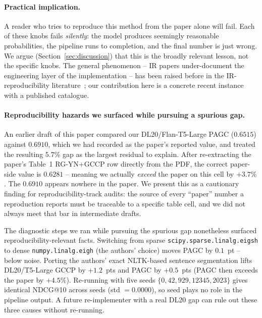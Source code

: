 \documentclass[sigconf]{acmart}
\begin{document}
\paragraph{Practical implication.} A reader who tries to reproduce
this method from the paper alone will fail. Each of these knobs
fails \emph{silently}: the model produces seemingly reasonable
probabilities, the pipeline runs to completion, and the final number
is just wrong. We argue (Section~\ref{sec:discussion}) that this is
the broadly relevant lesson, not the specific knobs. The general
phenomenon -- IR papers under-document the engineering layer of the
implementation -- has been raised before in the IR-reproducibility
literature~\cite{breuer2020repro,lin2022leveraging,lin2018msmarco};
our contribution here is a concrete recent instance with a published
catalogue.

\paragraph{Reproducibility hazards we surfaced while pursuing a
spurious gap.} An earlier draft of this paper compared our
DL20/Flan-T5-Large PAGC ($0.6515$) against $0.6910$, which we had
recorded as the paper's reported value, and treated the resulting
$5.7\%$ gap as the largest residual to explain. After re-extracting
the paper's Table~1 RG-YN+GCCP row directly from the PDF, the
correct paper-side value is $0.6281$ -- meaning we actually
\emph{exceed} the paper on this cell by $+3.7\%$. The $0.6910$
appears nowhere in the paper. We present this as a cautionary
finding for reproducibility-track audits: the source of every
``paper'' number a reproduction reports must be traceable to a
specific table cell, and we did not always meet that bar in
intermediate drafts.

The diagnostic steps we ran while pursuing the spurious gap
nonetheless surfaced reproducibility-relevant facts. Switching
from sparse \texttt{scipy.sparse.linalg.eigsh} to dense
\texttt{numpy.linalg.eigh} (the authors' choice) moves PAGC by
$0.1$~pt -- below noise. Porting the authors' exact NLTK-based
sentence segmentation lifts DL20/T5-Large GCCP by $+1.2$~pts and
PAGC by $+0.5$~pts (PAGC then exceeds the paper by $+4.5\%$).
Re-running with five seeds $\{0, 42, 929, 12345, 2023\}$ gives
identical NDCG@10 across seeds (std $=0.0000$), so seed plays no
role in the pipeline output. A future re-implementer with a real
DL20 gap can rule out these three causes without re-running.

\end{document}
